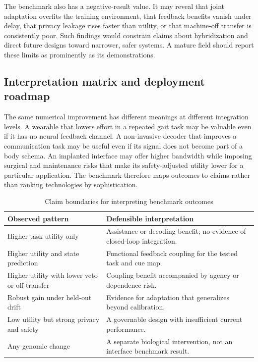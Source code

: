 \documentclass[conference]{IEEEtran}
\begin{document}
The benchmark also has a negative-result value. It may reveal that joint adaptation overfits the training environment, that feedback benefits vanish under delay, that privacy leakage rises faster than utility, or that machine-off transfer is consistently poor. Such findings would constrain claims about hybridization and direct future designs toward narrower, safer systems. A mature field should report these limits as prominently as its demonstrations.

\subsection{Interpretation matrix and deployment roadmap}

The same numerical improvement has different meanings at different integration levels. A wearable that lowers effort in a repeated gait task may be valuable even if it has no neural feedback channel. A non-invasive decoder that improves a communication task may be useful even if its signal does not become part of a body schema. An implanted interface may offer higher bandwidth while imposing surgical and maintenance risks that make its safety-adjusted utility lower for a particular application. The benchmark therefore maps outcomes to claims rather than ranking technologies by sophistication.

\begin{table}[t]
\caption{Claim boundaries for interpreting benchmark outcomes}
\label{tab:claims}
\centering
\scriptsize
\begin{tabular}{p{}p{}}
\toprule
Observed pattern & Defensible interpretation\\
\midrule
Higher task utility only & Assistance or decoding benefit; no evidence of closed-loop integration.\\
Higher utility and state prediction & Functional feedback coupling for the tested task and cue map.\\
Higher utility with lower veto or off-transfer & Coupling benefit accompanied by agency or dependence risk.\\
Robust gain under held-out drift & Evidence for adaptation that generalizes beyond calibration.\\
Low utility but strong privacy and safety & A governable design with insufficient current performance.\\
Any genomic change & A separate biological intervention, not an interface benchmark result.\\
\bottomrule
\end{tabular}
\end{table}
\end{document}
